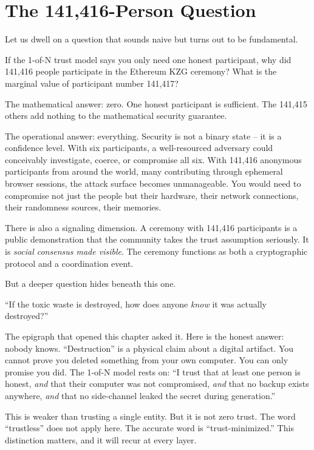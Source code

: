 \documentclass[
  11pt,
  openany]{report}
\begin{document}
\section{The 141,416-Person Question}\label{the-141416-person-question}

Let us dwell on a question that sounds naive but turns out to be fundamental.

If the 1-of-N trust model says you only need one honest participant, why did
141,416 people participate in the Ethereum KZG ceremony? What is the marginal
value of participant number 141,417?

The mathematical answer: zero. One honest participant is sufficient. The 141,415
others add nothing to the mathematical security guarantee.

The operational answer: everything. Security is not a binary state -- it is a
confidence level. With six participants, a well-resourced adversary could
conceivably investigate, coerce, or compromise all six. With 141,416 anonymous
participants from around the world, many contributing through ephemeral browser
sessions, the attack surface becomes unmanageable. You would need to compromise
not just the people but their hardware, their network connections, their
randomness sources, their memories.

There is also a signaling dimension. A ceremony with 141,416 participants is a
public demonstration that the community takes the trust assumption seriously. It
is \emph{social consensus made visible}. The ceremony functions as both a
cryptographic protocol and a coordination event.

But a deeper question hides beneath this one.

``If the toxic waste is destroyed, how does anyone \emph{know} it was actually
destroyed?''

The epigraph that opened this chapter asked it. Here is the honest answer:
nobody knows. ``Destruction'' is a physical claim about a digital artifact. You
cannot prove you deleted something from your own computer. You can only promise
you did. The 1-of-N model rests on: ``I trust that at least one person is
honest, \emph{and} that their computer was not compromised, \emph{and} that no
backup exists anywhere, \emph{and} that no side-channel leaked the secret during
generation.''

This is weaker than trusting a single entity. But it is not zero trust. The word
``trustless'' does not apply here. The accurate word is ``trust-minimized.''
This distinction matters, and it will recur at every layer.
\end{document}
